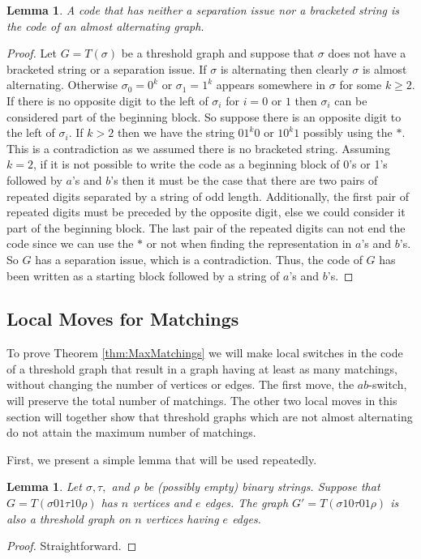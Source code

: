 \documentclass[12pt]{amsart}
\theoremstyle{plain}
\newtheorem{lem}[thm]{Lemma}
\theoremstyle{definition}
\begin{document}
\begin{lem}  
\label{almostalternating} A code that has neither a separation issue nor a bracketed string is the code of an almost alternating graph.
\end{lem}
\begin{proof}
Let $G = T(\sigma)$ be a threshold graph and suppose that $\sigma$ does not have a bracketed string or a separation issue.  If $\sigma$ is alternating then clearly $\sigma$ is almost alternating.  
Otherwise $\sigma_0=0^k$ or $\sigma_1=1^k$ appears somewhere in $\sigma$ for some $k\geq 2$.  
If there is no opposite digit to the left of $\sigma_i$ for $i=0$ or $1$ then $\sigma_i$ can be considered part of the beginning block.  
So suppose there is an opposite digit to the left of $\sigma_i$.  
If $k>2$ then we have the string $01^k0$ or $10^k1$ possibly using the $*$.  
This is a contradiction as we assumed there is no bracketed string.
Assuming $k=2$, if it is not possible to write the code as a beginning block of 0's or 1's followed by $a$'s and $b$'s then it must be the case that there are two pairs of repeated digits separated by a string of odd length.  Additionally, the first pair of repeated digits must be preceded by the opposite digit, else we could consider it part of the beginning block.  
The last pair of the repeated digits can not end the code since we can use the $*$ or not when finding the representation in $a$'s and $b$'s.
So $G$ has a separation issue, which is a contradiction.
 Thus, the code of $G$ has been written as a starting block followed by a string of $a$'s and $b$'s.\end{proof}




\subsection{Local Moves for Matchings}\label{sec:localmovesmatchings}
To prove Theorem \ref{thm:MaxMatchings} we will make local switches in the code of a threshold graph that result in a graph having at least as many matchings, without changing the number of vertices or edges.  The first move, the $ab$-switch, will preserve the total number of matchings.
The other two local moves in this section will together show that threshold graphs which are not almost alternating do not attain the maximum number of matchings.

First, we present a simple lemma that will be used repeatedly.
\begin{lem}
\label{abvertedge} Let $\sigma,\tau,$ and $\rho$ be (possibly empty) binary strings.  Suppose that $G=T(\sigma01\tau10\rho)$ has $n$ vertices and $e$ edges. The graph $G'=T(\sigma 10 \tau 01 \rho)$ is also a threshold graph on $n$ vertices having $e$ edges.
\end{lem}
\begin{proof}
	Straightforward.
\end{proof}
\end{document}

